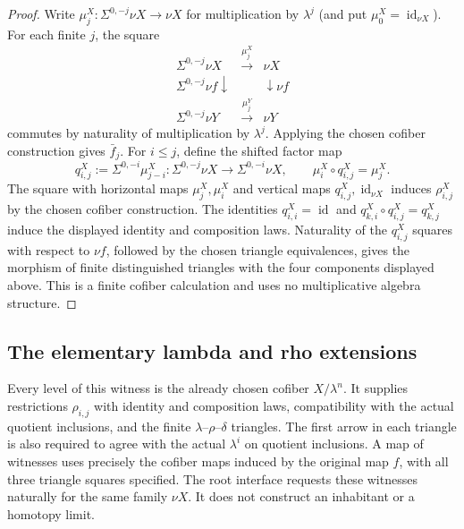 \begin{proof}
  Write $\mu^X_j:\Sigma^{0,-j}\nu X\to\nu X$ for multiplication by
  $\lambda^j$ (and put $\mu^X_0=\operatorname{id}_{\nu X}$).  For each finite
  $j$, the square
  \[
    \begin{array}{ccc}
      \Sigma^{0,-j}\nu X & \xrightarrow{\mu^X_j} & \nu X \\
      {\scriptstyle\Sigma^{0,-j}\nu f}\downarrow && \downarrow{\scriptstyle\nu f} \\
      \Sigma^{0,-j}\nu Y & \xrightarrow{\mu^Y_j} & \nu Y
    \end{array}
  \]
  commutes by naturality of multiplication by $\lambda^j$.  Applying the
  chosen cofiber construction gives $\bar f_j$.  For $i\le j$, define the shifted
  factor map
  \[
    q^X_{i,j}:=\Sigma^{0,-i}\mu^X_{j-i}:
      \Sigma^{0,-j}\nu X\longrightarrow\Sigma^{0,-i}\nu X,
    \qquad \mu^X_i\circ q^X_{i,j}=\mu^X_j.
  \]
  The square with horizontal maps $\mu^X_j,\mu^X_i$ and vertical maps
  $q^X_{i,j},\operatorname{id}_{\nu X}$ induces $\rho^X_{i,j}$ by the
  chosen cofiber construction.  The identities
  $q^X_{i,i}=\operatorname{id}$ and
  $q^X_{k,i}\circ q^X_{i,j}=q^X_{k,j}$ induce the displayed identity and
  composition laws.  Naturality of the $q^X_{i,j}$ squares with respect to
  $\nu f$, followed by the chosen triangle equivalences, gives the morphism
  of finite distinguished triangles with the four components displayed above.
  This is a finite cofiber calculation and uses no multiplicative algebra
  structure.
\end{proof}

\subsection{The elementary lambda and rho extensions}

\begin{definition}
  \label{def:finite-lambda-quotient-witness}
  \leanok
  Every level of this witness is the already chosen cofiber $X/\lambda^n$.
  It supplies restrictions $\rho_{i,j}$ with identity and composition laws,
  compatibility with the actual quotient inclusions, and the finite
  $\lambda$--$\rho$--$\delta$ triangles. The first arrow in each triangle
  is also required to agree with the actual $\lambda^i$ on quotient
  inclusions. A map of witnesses uses precisely the cofiber maps induced
  by the original map $f$, with all three triangle squares specified.
  The root interface requests these witnesses naturally for the same
  family $\nu X$. It does not construct an inhabitant or a homotopy limit.
\end{definition}

